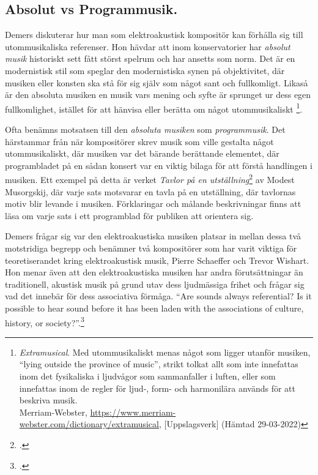 \documentclass{article}
\begin{document}


\subsection{Absolut vs Programmusik.}
Demers diskuterar hur man som elektroakustisk kompositör kan förhålla sig till utommusikaliska referenser.
Hon hävdar att inom konservatorier har \emph{absolut musik} historiskt sett fått störst spelrum och har ansetts
som norm. Det är en modernistisk stil som speglar den modernistiska synen på objektivitet, där musiken eller
konsten ska stå för sig själv som något sant och fullkomligt. Likaså är den absoluta musiken en musik vars
mening och syfte är sprunget ur dess egen fullkomlighet, istället för att hänvisa eller berätta om något
utommusikaliskt \footnote{\emph{Extramusical}. Med utommusikaliskt menas något som ligger utanför musiken, ``lying outside the
province of music'', strikt tolkat allt som inte innefattas inom det fysikaliska i ljudvågor som sammanfaller
i luften, eller som innefattas inom de regler för ljud-, form- och harmonilära används för att beskriva musik.
\\ Merriam-Webster, \url{https://www.merriam-webster.com/dictionary/extramusical}, [Uppslagsverk]
(Hämtad 29-03-2022)}\nocite{webster}.

Ofta benämns motsatsen till den \emph{absoluta musiken} som \emph{programmusik}. Det härstammar från när
kompositörer skrev musik som ville gestalta något utommusikaliskt, där musiken var det bärande berättande
elementet, där programbladet på en sådan konsert var en viktig bilaga för att förstå handlingen i musiken.
Ett exempel på detta är verket \emph{Tavlor på en utställning}\footcite{Tavlor} av Modest Musorgskij,
där varje sats motsvarar en tavla på en utställning, där tavlornas motiv blir levande i musiken. Förklaringar
och målande beskrivningar finns att läsa om varje sats i ett programblad för publiken att orientera sig.

Demers frågar sig var den elektroakustiska musiken platsar in mellan dessa två motstridiga begrepp och
benämner två kompositörer som har varit viktiga för teoretiserandet kring elektroakustisk musik, Pierre
Schaeffer och Trevor Wishart. Hon menar även att den elektroakustiska musiken har andra
förutsättningar än traditionell, akustisk musik på grund utav dess ljudmässiga frihet och frågar sig vad det
innebär för dess associativa förmåga. ``Are sounds always referential? Is it possible to hear sound
before it has been laden with the associations of culture, history, or
society?''.\footcite[23]{JoannaDemers}
\end{document}
